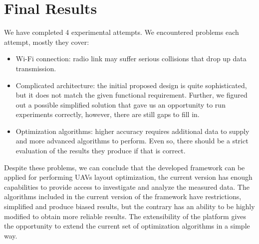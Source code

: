 \hypertarget{final-results}{%
\section{Final Results}\label{final-results}}

We have completed 4 experimental attempts. We encountered problems each
attempt, mostly they cover:

\begin{itemize}
\tightlist
\item
  Wi-Fi connection: radio link may suffer serious collisions that drop
  up data transmission.
\item
  Complicated architecture: the initial proposed design is
  quite sophisticated, but it does not match the given functional
  requirement. Further, we figured out a possible simplified solution
  that gave us an opportunity to run experiments correctly, however,
  there are still gaps to fill in.
\item
  Optimization algorithms: higher accuracy requires additional data to
  supply and more advanced algorithms to perform. Even so, there should
  be a strict evaluation of the results they produce if that is correct.
\end{itemize}

Despite these problems, we can conclude that the developed framework can
be applied for performing UAVs layout optimization, the current version
has enough capabilities to provide access to investigate and analyze the
measured data. The algorithms included in the current version of the
framework have restrictions, simplified and produce biased results, but
the contrary has an ability to be highly modified to obtain more
reliable results. The extensibility of the platform gives the
opportunity to extend the current set of optimization algorithms in a
simple way.
